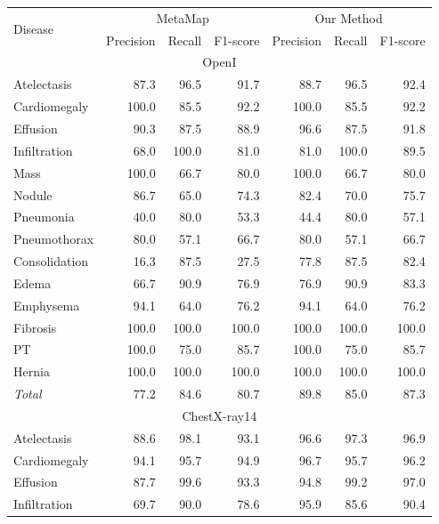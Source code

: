 \documentclass[10pt,twocolumn,letterpaper]{article}
\begin{document}
\begin{table}[t]
	\begin{center}
		\begin{tabular}{lr@{~/~}r@{~/~}rr@{~/~}r@{~/~}r}
			\hline
			\multirow{2}{*}{Disease} & \multicolumn{3}{c}{MetaMap} & \multicolumn{3}{c}{Our Method}\\\cline{2-7}
			& Precision & Recall & F1-score & Precision & Recall & F1-score\\\hline\hline
			\multicolumn{7}{c}{OpenI}\\
			\hline
			Atelectasis & 87.3 &96.5 &91.7 & 88.7 & 96.5 & 92.4\\
			Cardiomegaly & 100.0 &85.5 &92.2 & 100.0 &85.5 &92.2\\
			Effusion & 90.3 &87.5 &88.9  & 96.6 &87.5 &91.8\\
			Infiltration & 68.0 &100.0 &81.0 & 81.0 &100.0 &89.5\\
			Mass & 100.0 &66.7 &80.0 & 100.0 &66.7 &80.0\\
			Nodule & 86.7 &65.0 &74.3  & 82.4 &70.0 &75.7\\
			Pneumonia & 40.0 &80.0 &53.3 & 44.4 &80.0 &57.1\\
			Pneumothorax & 80.0 &57.1 &66.7 & 80.0 &57.1 &66.7\\
			Consolidation & 16.3 &87.5 &27.5 & 77.8 &87.5 &82.4 \\
			Edema & 66.7 &90.9 &76.9 & 76.9 &90.9 &83.3\\
			Emphysema & 94.1 &64.0 &76.2 &94.1 &64.0 &76.2\\
			Fibrosis & 100.0 &100.0 &100.0 &100.0 &100.0 &100.0\\
			PT & 100.0 &75.0 &85.7 &100.0 &75.0 &85.7 \\
			Hernia & 100.0 &100.0 &100.0 &100.0 &100.0 &100.0\\
			\hspace*{1em}\textit{Total} & 77.2& 84.6& 80.7 & 89.8 &85.0 &87.3\\
			\hline
			\multicolumn{7}{c}{ChestX-ray14}\\
			\hline
			Atelectasis & 88.6& 98.1& 93.1 & 96.6& 97.3& 96.9\\
			Cardiomegaly & 94.1& 95.7& 94.9  & 96.7& 95.7& 96.2\\
			Effusion & 87.7& 99.6& 93.3  & 94.8& 99.2& 97.0\\
			Infiltration & 69.7& 90.0& 78.6&95.9& 85.6& 90.4\\

\end{tabular}
\end{center}
\end{table}
\end{document}
